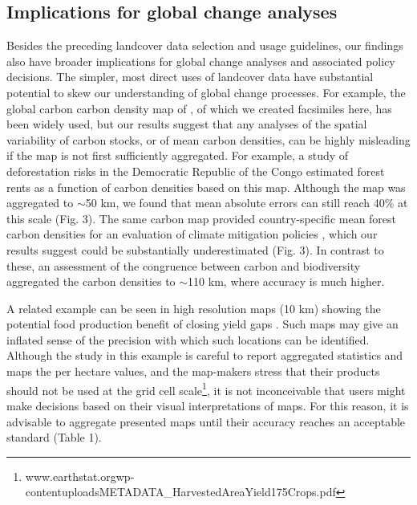 \documentclass{pnastwo2}
\begin{document}
\begin{article}
\subsection{Implications for global change analyses}
Besides the preceding landcover data selection and usage guidelines, our findings also have broader implications for global change analyses and associated policy decisions. The simpler, most direct uses of landcover data have substantial potential to skew our understanding of global change processes. For example, the global carbon carbon density map of \cite{ruesch_new_2008}, of which we created facsimiles here, has been widely used, but our results suggest that any analyses of the spatial variability of carbon stocks, or of mean carbon densities, can be highly misleading if the map is not first sufficiently aggregated. For example, a study of deforestation risks in the Democratic Republic of the Congo estimated forest rents as a function of carbon densities based on this map. Although the map was aggregated to $\sim$50 km, we found that mean absolute errors can still reach 40\% at this scale (Fig. 3). The same carbon map provided country-specific mean forest carbon densities for an evaluation of climate mitigation policies \cite{cattaneo_international_2010}, which our results suggest could be substantially underestimated (Fig. 3). In contrast to these, an assessment of the congruence between carbon and biodiversity \cite{strassburg_global_2010} aggregated the carbon densities to $\sim$110 km, where accuracy is much higher. 

A related example can be seen in high resolution maps (10 km) showing the potential food production benefit of closing yield gaps \cite[e.g. Figure 3 in][]{foley_solutions_2011}. Such maps may give an inflated sense of the precision with which such locations can be identified. Although the study in this example is careful to report aggregated statistics and maps the per hectare values, and the map-makers stress that their products should not be used at the grid cell scale\footnote{www.earthstat.org\/wp-content\/uploads\/METADATA\_HarvestedAreaYield175Crops.pdf}, it is not inconceivable that users might make decisions based on their visual interpretations of maps. For this reason, it is advisable to aggregate presented maps until their accuracy reaches an acceptable standard (Table 1). 


\end{article}
\end{document}
